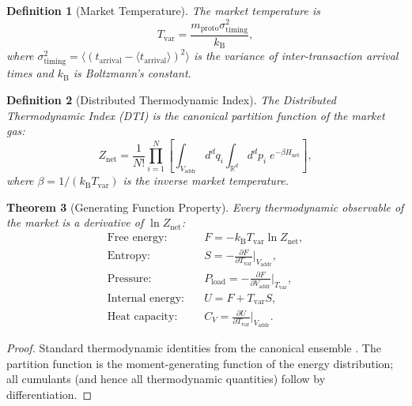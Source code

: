 \documentclass[twocolumn,10pt]{article}
\newtheorem{theorem}{Theorem}[section]
\newtheorem{definition}[theorem]{Definition}
\theoremstyle{remark}
\newcommand{\kB}{k_{\mathrm{B}}}
\newcommand{\Tvar}{T_{\mathrm{var}}}
\newcommand{\Pload}{P_{\mathrm{load}}}
\newcommand{\Vaddr}{V_{\mathrm{addr}}}
\newcommand{\mproto}{m_{\mathrm{proto}}}
\newcommand{\Hnet}{H_{\mathrm{net}}}
\newcommand{\Znet}{Z_{\mathrm{net}}}
\begin{document}
\begin{definition}[Market Temperature]
\label{def:market_temperature}
The \emph{market temperature} is
\begin{equation}
    \Tvar = \frac{\mproto \sigma^2_{\mathrm{timing}}}{\kB},
    \label{eq:market_temp}
\end{equation}
where $\sigma^2_{\mathrm{timing}} = \langle (t_{\mathrm{arrival}} - \langle t_{\mathrm{arrival}} \rangle)^2 \rangle$ is the variance of inter-transaction arrival times and $\kB$ is Boltzmann's constant.
\end{definition}

\begin{definition}[Distributed Thermodynamic Index]
\label{def:dti}
The \emph{Distributed Thermodynamic Index} (DTI) is the canonical partition function of the market gas:
\begin{equation}
    \boxed{\Znet = \frac{1}{N!} \prod_{i=1}^{N} \left[\int_{\Vaddr} d^d q_i \int_{\mathbb{R}^d} d^d p_i \; e^{-\beta \Hnet}\right]},
    \label{eq:dti}
\end{equation}
where $\beta = 1/(\kB \Tvar)$ is the inverse market temperature.
\end{definition}

\begin{theorem}[Generating Function Property]
\label{thm:generating}
Every thermodynamic observable of the market is a derivative of $\ln \Znet$:
\begin{align}
    \text{Free energy:} & \quad F = -\kB \Tvar \ln \Znet, \label{eq:free_energy} \\
    \text{Entropy:} & \quad S = -\frac{\partial F}{\partial \Tvar}\bigg|_{\Vaddr}, \label{eq:entropy} \\
    \text{Pressure:} & \quad \Pload = -\frac{\partial F}{\partial \Vaddr}\bigg|_{\Tvar}, \label{eq:pressure} \\
    \text{Internal energy:} & \quad U = F + \Tvar S, \label{eq:internal_energy} \\
    \text{Heat capacity:} & \quad C_V = \frac{\partial U}{\partial \Tvar}\bigg|_{\Vaddr}. \label{eq:heat_capacity}
\end{align}
\end{theorem}

\begin{proof}
Standard thermodynamic identities from the canonical ensemble \cite{landau1980,huang1987,pathria2011}.  The partition function is the moment-generating function of the energy distribution; all cumulants (and hence all thermodynamic quantities) follow by differentiation.
\end{proof}
\end{document}
